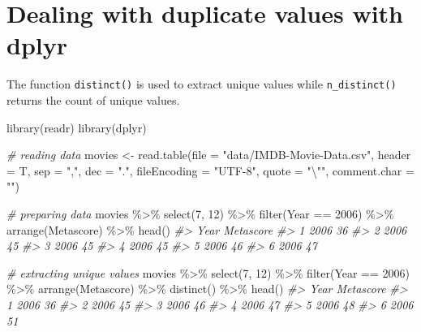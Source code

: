 \documentclass[
]{book}
\newenvironment{Shaded}{\begin{snugshade}}{\end{snugshade}}
\newcommand{\AttributeTok}[1]{\textcolor[rgb]{0.77,0.63,0.00}{#1}}
\newcommand{\CommentTok}[1]{\textcolor[rgb]{0.56,0.35,0.01}{\textit{#1}}}
\newcommand{\DecValTok}[1]{\textcolor[rgb]{0.00,0.00,0.81}{#1}}
\newcommand{\FunctionTok}[1]{\textcolor[rgb]{0.00,0.00,0.00}{#1}}
\newcommand{\NormalTok}[1]{#1}
\newcommand{\OtherTok}[1]{\textcolor[rgb]{0.56,0.35,0.01}{#1}}
\newcommand{\SpecialCharTok}[1]{\textcolor[rgb]{0.00,0.00,0.00}{#1}}
\newcommand{\StringTok}[1]{\textcolor[rgb]{0.31,0.60,0.02}{#1}}
\begin{document}
\hypertarget{dealing-with-duplicate-values-with-dplyr}{%
\section{Dealing with duplicate values with dplyr}\label{dealing-with-duplicate-values-with-dplyr}}

The function \texttt{distinct()} is used to extract unique values while \texttt{n\_distinct()} returns the count of unique values.

\begin{Shaded}
\begin{Highlighting}[]
\FunctionTok{library}\NormalTok{(readr)}
\FunctionTok{library}\NormalTok{(dplyr)}

\CommentTok{\# reading data}
\NormalTok{movies }\OtherTok{\textless{}{-}} \FunctionTok{read.table}\NormalTok{(}\AttributeTok{file =} \StringTok{"data/IMDB{-}Movie{-}Data.csv"}\NormalTok{, }\AttributeTok{header =}\NormalTok{ T, }\AttributeTok{sep =} \StringTok{","}\NormalTok{, }\AttributeTok{dec =} \StringTok{"."}\NormalTok{, }\AttributeTok{fileEncoding =} \StringTok{"UTF{-}8"}\NormalTok{, }\AttributeTok{quote =} \StringTok{"}\SpecialCharTok{\textbackslash{}"}\StringTok{"}\NormalTok{,}
                  \AttributeTok{comment.char =} \StringTok{""}\NormalTok{)}


\CommentTok{\# preparing data}
\NormalTok{movies }\SpecialCharTok{\%\textgreater{}\%}
\FunctionTok{select}\NormalTok{(}\DecValTok{7}\NormalTok{, }\DecValTok{12}\NormalTok{) }\SpecialCharTok{\%\textgreater{}\%}
\FunctionTok{filter}\NormalTok{(Year }\SpecialCharTok{==} \DecValTok{2006}\NormalTok{) }\SpecialCharTok{\%\textgreater{}\%}
\FunctionTok{arrange}\NormalTok{(Metascore) }\SpecialCharTok{\%\textgreater{}\%}
\FunctionTok{head}\NormalTok{()}
\CommentTok{\#\textgreater{}   Year Metascore}
\CommentTok{\#\textgreater{} 1 2006        36}
\CommentTok{\#\textgreater{} 2 2006        45}
\CommentTok{\#\textgreater{} 3 2006        45}
\CommentTok{\#\textgreater{} 4 2006        45}
\CommentTok{\#\textgreater{} 5 2006        46}
\CommentTok{\#\textgreater{} 6 2006        47}

\CommentTok{\# extracting unique values}
\NormalTok{movies }\SpecialCharTok{\%\textgreater{}\%}
\FunctionTok{select}\NormalTok{(}\DecValTok{7}\NormalTok{, }\DecValTok{12}\NormalTok{) }\SpecialCharTok{\%\textgreater{}\%}
\FunctionTok{filter}\NormalTok{(Year }\SpecialCharTok{==} \DecValTok{2006}\NormalTok{) }\SpecialCharTok{\%\textgreater{}\%}
\FunctionTok{arrange}\NormalTok{(Metascore) }\SpecialCharTok{\%\textgreater{}\%}
\FunctionTok{distinct}\NormalTok{() }\SpecialCharTok{\%\textgreater{}\%}
\FunctionTok{head}\NormalTok{()}
\CommentTok{\#\textgreater{}   Year Metascore}
\CommentTok{\#\textgreater{} 1 2006        36}
\CommentTok{\#\textgreater{} 2 2006        45}
\CommentTok{\#\textgreater{} 3 2006        46}
\CommentTok{\#\textgreater{} 4 2006        47}
\CommentTok{\#\textgreater{} 5 2006        48}
\CommentTok{\#\textgreater{} 6 2006        51}


\end{Highlighting}
\end{Shaded}
\end{document}

